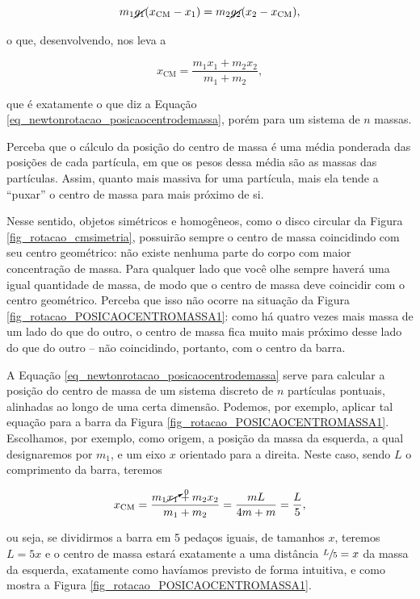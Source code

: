 $$ m_1 \cancel {g_1}(x_\text{CM}-x_1) = m_2 \cancel {g_2}(x_2 - x_\text{CM} ), $$

\noindent o que, desenvolvendo, nos leva a

$$ x_\text{CM} = \dfrac{m_1 x_1 + m_2x_2}{m_1 + m_2}, $$

\noindent que é exatamente o que diz a Equação \eqref{eq_newtonrotacao_posicaocentrodemassa}, porém para um sistema de $n$ massas.

Perceba que o cálculo da posição do centro de massa é uma média ponderada das posições de cada partícula, em que os pesos dessa média são as massas das partículas. Assim, quanto mais massiva for uma partícula, mais ela tende a ``puxar'' o centro de massa para mais próximo de si. 

Nesse sentido, objetos simétricos e homogêneos, como o disco circular da Figura \ref{fig_rotacao_cmsimetria}, possuirão sempre o centro de massa coincidindo com seu centro geométrico: não existe nenhuma parte do corpo com maior concentração de massa. Para qualquer lado que você olhe sempre haverá uma igual quantidade de massa, de modo que o centro de massa deve coincidir com o centro geométrico. Perceba que isso não ocorre na situação da Figura \ref{fig_rotacao_POSICAOCENTROMASSA1}: como há quatro vezes mais massa de um lado do que do outro, o centro de massa fica muito mais próximo desse lado do que do outro -- não coincidindo, portanto, com o centro da barra.





A Equação \eqref{eq_newtonrotacao_posicaocentrodemassa} serve para calcular a posição do centro de massa de um sistema discreto de $n$ partículas pontuais, alinhadas ao longo de uma certa dimensão. Podemos, por exemplo, aplicar tal equação para a barra da Figura \ref{fig_rotacao_POSICAOCENTROMASSA1}. Escolhamos, por exemplo, como origem, a posição da massa da esquerda, a qual designaremos por $m_1$, e um eixo $x$ orientado para a direita. Neste caso, sendo $L$ o comprimento da barra, teremos

$$ x_\text{CM} = \dfrac{m_1 \cancelto{0}{x_1} + m_2x_2}{m_1 + m_2}  = \dfrac{mL}{4m + m} = \dfrac{L}{5},$$

\noindent ou seja, se dividirmos a barra em 5 pedaços iguais, de tamanhos $x$, teremos $L=5x$ e o centro de massa estará exatamente a uma distância $\sfrac{L}{5}=x$ da massa da esquerda, exatamente como havíamos previsto de forma intuitiva, e como mostra a Figura \ref{fig_rotacao_POSICAOCENTROMASSA1}.

